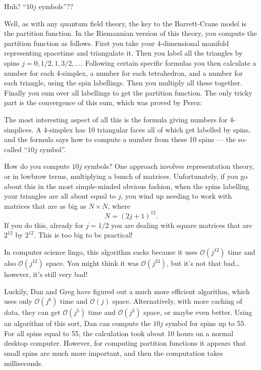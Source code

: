 \documentclass{article}
\def\tightlist{}
\renewcommand{\texttt}[1]{%
  \begingroup
  \ttfamily
  \begingroup\lccode`~=`/\lowercase{\endgroup\def~}{/\discretionary{}{}{}}%
  \begingroup\lccode`~=`[\lowercase{\endgroup\def~}{[\discretionary{}{}{}}%
  \begingroup\lccode`~=`.\lowercase{\endgroup\def~}{.\discretionary{}{}{}}%
  \catcode`/=\active\catcode`[=\active\catcode`.=\active
  \scantokens{#1\noexpand}%
  \endgroup
}
\begin{document}
Huh? ``\(10j\) symbols''??

Well, as with any quantum field theory, the key to the Barrett-Crane
model is the partition function. In the Riemannian version of this
theory, you compute the partition function as follows. First you take
your 4-dimensional manifold representing spacetime and triangulate it.
Then you label all the triangles by spins
\(j = 0, 1/2, 1, 3/2, \ldots\). Following certain specific formulas you
then calculate a number for each 4-simplex, a number for each
tetrahedron, and a number for each triangle, using the spin labellings.
Then you multiply all these together. Finally you sum over all
labellings to get the partition function. The only tricky part is the
convergence of this sum, which was proved by Perez:


The most interesting aspect of all this is the formula giving numbers
for 4-simplices. A 4-simplex has 10 triangular faces all of which get
labelled by spins, and the formula says how to compute a number from
these 10 spins --- the so-called ``\(10j\) symbol''.

How do you compute \(10j\) symbols? One approach involves representation
theory, or in lowbrow terms, multiplying a bunch of matrices.
Unfortunately, if you go about this in the most simple-minded obvious
fashion, when the spins labelling your triangles are all about equal to
\(j\), you wind up needing to work with matrices that are as big as
\(N\times N\), where \[N = (2j+1)^{12}.\] If you do this, already for
\(j = 1/2\) you are dealing with square matrices that are \(2^{12}\) by
\(2^{12}\). This is too big to be practical!

In computer science lingo, this algorithm sucks because it uses
\(\mathcal{O}(j^{12})\) time and also \(\mathcal{O}(j^{12})\) space. You
might think it was \(\mathcal{O}(j^{24})\), but it's not that
bad\ldots{} however, it's still very bad!

Luckily, Dan and Greg have figured out a much more efficient algorithm,
which uses only \(\mathcal{O}(j^6)\) time and \(\mathcal{O}(j)\) space.
Alternatively, with more caching of data, they can get
\(\mathcal{O}(j^5)\) time and \(\mathcal{O}(j^3)\) space, or maybe even
better. Using an algorithm of this sort, Dan can compute the \(10j\)
symbol for spins up to 55. For all spins equal to 55, the calculation
took about 10 hours on a normal desktop computer. However, for computing
partition functions it appears that small spins are much more important,
and then the computation takes milliseconds.
\end{document}
